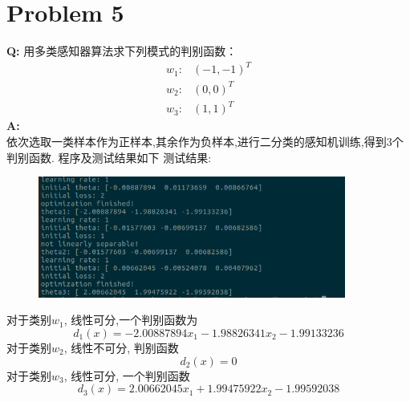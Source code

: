 \documentclass[12pt,a4paper]{article}
\begin{document}
\section{Problem 5}
\textbf{Q: }
用多类感知器算法求下列模式的判别函数：
\[
 \begin{split} 
	w_1: & (-1,-1)^T\\
	w_2: & (0,0)^T \\
	w_3: & (1,1)^T 
 \end{split}  
\]
\textbf{A: } \\
 依次选取一类样本作为正样本,其余作为负样本,进行二分类的感知机训练,得到3个判别函数.
  程序及测试结果如下
  测试结果:   
  \begin{figure}[H]
  	\centering
  	\includegraphics[width = 0.9\textwidth]{multi}
  \end{figure}	
 对于类别$w_1$, 线性可分,一个判别函数为
 \[
	 d_1(x) = -2.00887894x_1 -1.98826341x_2 -1.99133236
 \]	
 对于类别$w_2$, 线性不可分, 判别函数
 \[
	 d_2(x) = 0
 \]
 对于类别$w_3$, 线性可分, 一个判别函数
 \[
     d_3(x) = 2.00662045x_1 +1.99475922x_2 -1.99592038
 \]
\end{document}
